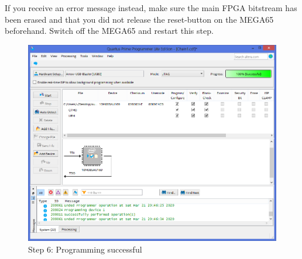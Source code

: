 If you receive an error message instead, make sure the main FPGA
bitstream has been erased and that you did not release the reset-button on
the MEGA65 beforehand. Switch off the MEGA65 and restart this step.

\begin{figure}[H]
  \centering
  \includegraphics[width=0.8\linewidth]{images/max10_06.png}
  \captionsetup{width=0.8\linewidth}
  \caption{Step 6: Programming successful}
  \label{fig:max10_06}
\end{figure}

